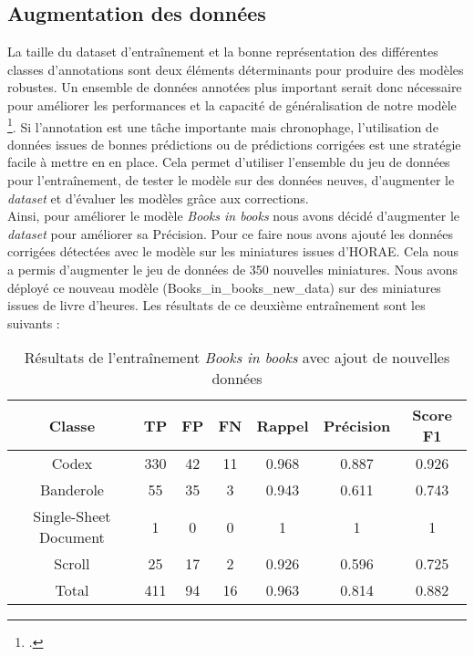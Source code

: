 \documentclass[12pt,twoside]{book}
\begin{document}
\subsection{Augmentation des données}

La taille du dataset d’entraînement et la bonne représentation des différentes classes d’annotations sont deux éléments déterminants pour produire des modèles robustes. Un ensemble de données annotées plus important serait donc nécessaire pour améliorer les performances et la capacité de généralisation de notre modèle \footcite{aouinti_illumination_2022}.
Si l’annotation est une tâche importante mais chronophage, l’utilisation de données issues de bonnes prédictions ou de prédictions corrigées est une stratégie facile à mettre en en place. Cela permet d’utiliser l’ensemble du jeu de données pour l’entraînement, de tester le modèle sur des données neuves, d'augmenter le \textit{dataset }et d'évaluer les modèles grâce aux corrections. \\

Ainsi, pour améliorer le modèle \textit{Books in books} nous avons décidé d’augmenter le \textit{dataset} pour améliorer sa Précision. Pour ce faire nous avons ajouté les données corrigées détectées avec le modèle sur les miniatures issues d’HORAE. Cela nous a permis d’augmenter le jeu de données de 350 nouvelles miniatures. Nous avons déployé ce nouveau modèle (Books\_in\_books\_new\_data) sur des miniatures issues de livre d’heures. Les résultats de ce deuxième entraînement sont les suivants :\\


\begin{table}[ht]
    \centering
    \begin{tabular}{|c|c|c|c|c|c|c|}
    \hline
    \textbf{Classe} & \textbf{TP} & \textbf{FP} & \textbf{FN} & \textbf{Rappel} & \textbf{Précision} & \textbf{Score F1} \\
    \hline
    Codex & 330 & 42 & 11 & 0.968 & 0.887 & 0.926 \\ 
    \hline
    Banderole & 55 & 35 & 3 & 0.943 & 0.611 & 0.743 \\ 
    \hline
    Single-Sheet Document & 1 & 0 & 0 & 1 & 1 & 1 \\ 
    \hline
    Scroll & 25 & 17 & 2 & 0.926 & 0.596 & 0.725 \\ 
    \hline
    Total & 411 & 94 & 16 & 0.963 & 0.814 & 0.882 \\ 
    \hline
    \end{tabular}
    \vspace{0.5cm}  %
    \caption{Résultats de l'entraînement \textit{Books in books} avec ajout de nouvelles données}
\end{table}
\end{document}
